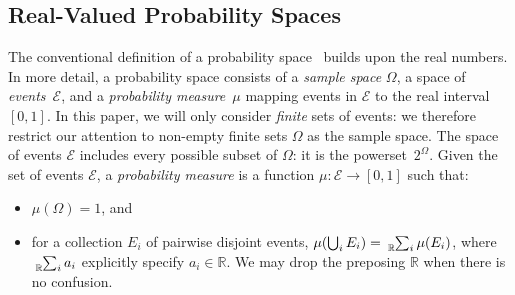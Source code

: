 \documentclass{article}
\theoremstyle{remark}
\newcommand{\events}{\ensuremath{\mathcal{E}}}
\newcommand{\pmeas}{\ensuremath{\mu}}
\begin{document}
\subsection{Real-Valued Probability Spaces}

The conventional definition of a probability
space~\cite{Kolmogorov1950,rohatgi2011introduction,Swart2013}
builds upon the real numbers. In more detail, a probability space
consists of a \emph{sample space} $\Omega$, a space of
\emph{events}~$\events$, and a \emph{probability measure}~$\pmeas$
mapping events in $\events$ to the real interval $[0,1]$. In this
paper, we will only consider \emph{finite} sets of events: we
therefore restrict our attention to non-empty finite sets $\Omega$ as
the sample space. The space of events $\events$ includes every
possible subset of $\Omega$: it is the powerset~$2^\Omega$. Given the
set of events $\events$, a \emph{probability measure} is a function
$\pmeas : \events \rightarrow [0,1]$ such that:
\begin{itemize}
\item $\pmeas(\Omega) = 1$, and 
\item for a collection $E_{i}$ of pairwise disjoint events, $\pmeas(\bigcup_{i}E_{i})=\tensor*[_{\mathbb{R}}]{\sum}{_{i}}\pmeas(E_{i})$,
where $\tensor*[_{\mathbb{R}}]{\sum}{_{i}}a_{i}$
explicitly specify $a_{i}\in\mathbb{R}$. We may drop the preposing
$\mathbb{R}$ when there is no confusion. 
\end{itemize}
\end{document}
